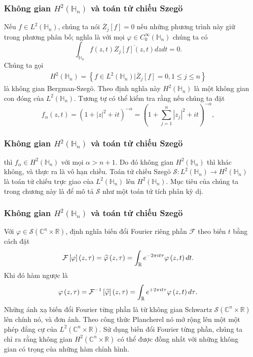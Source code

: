 \documentclass[11pt]{beamer}
\numberwithin{equation}{section}
\theoremstyle{plain}
\theoremstyle{definition}
\theoremstyle{remark}
\begin{document}
\begin{frame}\frametitle{Không gian $H^{2}\left(\mathbb{H}_{n}\right)$ và toán tử chiếu Szeg\"o}
Nếu $f\in L^{2}\left(\mathbb{H}_{n}\right)$, chúng ta nói $\overline{Z}_{j}\left[f\right]=0$ nếu những phương trình này giữ trong phương phân bố; nghĩa là với mọi $\varphi\in C_0^\infty\left(\mathbb{H}_{n}\right)$ chúng ta có
\[\int_{{\mathbb{H}_n}} {f\left( {z,t} \right)\overline {{Z_j}\left[ f \right]\left( {z,t} \right)} dzdt}  = 0.\]
Chúng ta gọi 
\begin{align}\label{69}
{H^2}\left( {{\mathbb{H}_n}} \right) = \left\{ {f \in {L^2}\left( {{\mathbb{H}_n}} \right)|{{\overline Z }_j}\left[ f \right] = 0,1 \le j \le n} \right\}
\end{align}
là không gian Bergman-Szeg\"o.
Theo định nghĩa này $H^{2}\left(\mathbb{H}_{n}\right)$ là một không gian con đóng của $L^{2}\left(\mathbb{H}_{n}\right)$. Tương tự có thể kiểm tra rằng nếu chúng ta  đặt
\[{f_\alpha }\left( {z,t} \right) = {\left( {1 + {{\left| z \right|}^2} + it} \right)^{ - \alpha }} = {\left( {1 + \sum\limits_{j = 1}^n {{{\left| {{z_j}} \right|}^2} + it} } \right)^{ - \alpha }},\]

\end{frame}


\begin{frame}\frametitle{Không gian $H^{2}\left(\mathbb{H}_{n}\right)$ và toán tử chiếu Szeg\"o}
thì $f_{\alpha}\in H^{2}\left(\mathbb{H}_{n}\right)$ với mọi $\alpha>n+1$. Do đó không gian $H^{2}\left(\mathbb{H}_{n}\right)$ thì khác không, và thực ra là vô hạn chiều. Toán tử chiếu Szeg\"o $\mathcal{S}:L^{2}\left(\mathbb{H}_{n}\right)\to H^{2}\left(\mathbb{H}_{n}\right)$ là toán tử chiếu trực giao của $L^{2}\left(\mathbb{H}_{n}\right)$ lên $H^{2}\left(\mathbb{H}_{n}\right)$. Mục tiêu của chúng ta trong chương này là để mô tả $\mathcal{S}$ như một toán tử tích phân kỳ dị.
\end{frame}


\begin{frame}\frametitle{Không gian $H^{2}\left(\mathbb{H}_{n}\right)$ và toán tử chiếu Szeg\"o}
Với $\varphi\in\mathcal{S}\left(\mathbb{C}^{n}\times\mathbb{R}\right)$, định nghĩa biến đổi Fourier riêng phần $\mathcal{F}$ theo biến $t$ bằng cách đặt 
\[{\cal F}\left[ \varphi  \right]\left( {z,\tau } \right) = \widehat \varphi \left( {z,\tau } \right) = \int_\mathbb{R} {{e^{ - 2\pi it\tau }}\varphi \left( {z,t} \right)dt} .\]
Khi đó hàm ngược là
\[\varphi \left( {z,\tau } \right) = {{\cal F}^{ - 1}}\left[ {\widehat \varphi } \right]\left( {z,\tau } \right) = \int_\mathbb{R} {{e^{ + 2\pi it\tau }}\varphi \left( {z,t} \right)d\tau } .\]
Những ánh xạ biến đổi Fourier từng phần là từ không gian Schwartz $\mathcal{S}\left(\mathbb{C}^{n}\times\mathbb{R}\right)$ lên chính nó, và đơn ánh. Theo công thức Plancherel nó mở rộng lên một một phép đẳng cự của $L^{2}\left(\mathbb{C}^{n}\times\mathbb{R}\right)$. Sử dụng biến đổi Fourier từng phần, chúng ta chỉ ra rằng không gian $H^{2}\left(\mathbb{C}^{n}\times\mathbb{R}\right)$ có thể được đồng nhất với những không gian có trọng của những hàm chỉnh hình.
\end{frame}
\end{document}
